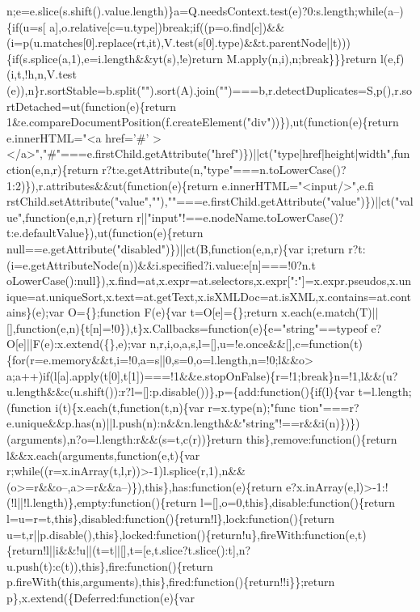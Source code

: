 \begin{DoxyCode}
{       n;e=e.slice(s.shift().value.length)\}a=Q.needsContext.test(e)?0:s.length;while(a--)\{if(u=s[
      a],o.relative[c=u.type])break;if((p=o.find[c])&&(i=p(u.matches[0].replace(rt,it),V.test(s[0].type)&&t.parentNode||t)))\{if(s.splice(a,1),e=i.length&&yt(s),!e)return M.apply(n,i),n;break\}\}\}return
       l(e,f)(i,t,!h,n,V.test
      (e)),n\}r.sortStable=b.split("").sort(A).join("")===b,r.detectDuplicates=S,p(),r.sortDetached=ut(function(e)\{return 1&e.compareDocumentPosition(f.createElement("div"))\}),ut(function(e)\{return e.innerHTML="<a href='}#\textcolor{stringliteral}{'
      ></a>","#"===e.firstChild.getAttribute("href")\})||ct("type|href|height|width",function(e,n,r)\{return
       r?t:e.getAttribute(n,"type"===n.toLowerCase()?1:2)\}),r.attributes&&ut(function(e)\{return
       e.innerHTML="<input/>",e.fi
      rstChild.setAttribute("value",""),""===e.firstChild.getAttribute("value")\})||ct("value",function(e,n,r)\{return r||"input"!==e.nodeName.toLowerCase()?t:e.defaultValue\}),ut(function(e)\{return
       null==e.getAttribute("disabled")\})||ct(B,function(e,n,r)\{var i;return
       r?t:(i=e.getAttributeNode(n))&&i.specified?i.value:e[n]===!0?n.t
      oLowerCase():null\}),x.find=at,x.expr=at.selectors,x.expr[":"]=x.expr.pseudos,x.unique=at.uniqueSort,x.text=at.getText,x.isXMLDoc=at.isXML,x.contains=at.contains\}(e);var O=\{\};function F(e)\{var t=O[e]=\{\};return
       x.each(e.match(T)||[],function(e,n)\{t[n]=!0\}),t\}x.Callbacks=function(e)\{e="string"==typeof
       e?O[e]||F(e):x.extend(\{\},e);var
       n,r,i,o,a,s,l=[],u=!e.once&&[],c=function(t)\{for(r=e.memory&&t,i=!0,a=s||0,s=0,o=l.length,n=!0;l&&o>
      a;a++)if(l[a].apply(t[0],t[1])===!1&&e.stopOnFalse)\{r=!1;break\}n=!1,l&&(u?u.length&&c(u.shift()):r?l=[]:p.disable())\},p=\{add:function()\{if(l)\{var t=l.length;(function i(t)\{x.each(t,function(t,n)\{var
       r=x.type(n);"func
      tion"===r?e.unique&&p.has(n)||l.push(n):n&&n.length&&"string"!==r&&i(n)\})\})(arguments),n?o=l.length:r&&(s=t,c(r))\}return this\},remove:function()\{return l&&x.each(arguments,function(e,t)\{var
       r;while((r=x.inArray(t,l,r))>-1)l.splice(r,1),n&&(o>=r&&o--,a>=r&&a--)\}),this\},has:function(e)\{return
       e?x.inArray(e,l)>-1:!(!l||!l.length)\},empty:function()\{return l=[],o=0,this\},disable:function()\{return
       l=u=r=t,this\},disabled:function()\{return!l\},lock:function()\{return
       u=t,r||p.disable(),this\},locked:function()\{return!u\},fireWith:function(e,t)\{return!l||i&&!u||(t=t||[],t=[e,t.slice?t.slice():t],n?u.push(t):c(t)),this\},fire:function()\{return
       p.fireWith(this,arguments),this\},fired:function()\{return!!i\}\};return p\},x.extend(\{Deferred:function(e)\{var
}
\end{DoxyCode}
